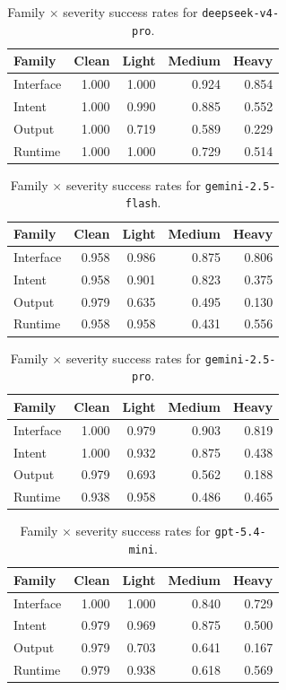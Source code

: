 \documentclass[11pt]{article}
\begin{document}
\begin{table}[htbp]
\centering
\small
\begin{tabular}{lrrrr}
\toprule
Family & Clean & Light & Medium & Heavy \\
\midrule
Interface & 1.000 & 1.000 & 0.924 & 0.854 \\
Intent & 1.000 & 0.990 & 0.885 & 0.552 \\
Output & 1.000 & 0.719 & 0.589 & 0.229 \\
Runtime & 1.000 & 1.000 & 0.729 & 0.514 \\
\bottomrule
\end{tabular}
\caption{Family $\times$ severity success rates for \texttt{deepseek-v4-pro}.}
\label{tab:deepseek-pro-severity}
\end{table}

\begin{table}[htbp]
\centering
\small
\begin{tabular}{lrrrr}
\toprule
Family & Clean & Light & Medium & Heavy \\
\midrule
Interface & 0.958 & 0.986 & 0.875 & 0.806 \\
Intent & 0.958 & 0.901 & 0.823 & 0.375 \\
Output & 0.979 & 0.635 & 0.495 & 0.130 \\
Runtime & 0.958 & 0.958 & 0.431 & 0.556 \\
\bottomrule
\end{tabular}
\caption{Family $\times$ severity success rates for \texttt{gemini-2.5-flash}.}
\label{tab:gemini-flash-severity}
\end{table}

\begin{table}[htbp]
\centering
\small
\begin{tabular}{lrrrr}
\toprule
Family & Clean & Light & Medium & Heavy \\
\midrule
Interface & 1.000 & 0.979 & 0.903 & 0.819 \\
Intent & 1.000 & 0.932 & 0.875 & 0.438 \\
Output & 0.979 & 0.693 & 0.562 & 0.188 \\
Runtime & 0.938 & 0.958 & 0.486 & 0.465 \\
\bottomrule
\end{tabular}
\caption{Family $\times$ severity success rates for \texttt{gemini-2.5-pro}.}
\label{tab:gemini-pro-severity}
\end{table}

\begin{table}[htbp]
\centering
\small
\begin{tabular}{lrrrr}
\toprule
Family & Clean & Light & Medium & Heavy \\
\midrule
Interface & 1.000 & 1.000 & 0.840 & 0.729 \\
Intent & 0.979 & 0.969 & 0.875 & 0.500 \\
Output & 0.979 & 0.703 & 0.641 & 0.167 \\
Runtime & 0.979 & 0.938 & 0.618 & 0.569 \\
\bottomrule
\end{tabular}
\caption{Family $\times$ severity success rates for \texttt{gpt-5.4-mini}.}
\label{tab:gpt-mini-severity}
\end{table}
\end{document}

